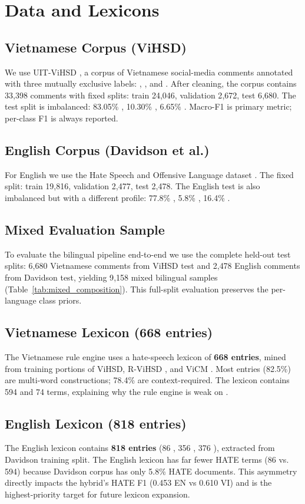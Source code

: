 \section{Data and Lexicons}
\label{sec:data}

\subsection{Vietnamese Corpus (ViHSD)}
We use UIT-ViHSD \cite{luu2021vihsd}, a corpus of Vietnamese social-media
comments annotated with three mutually exclusive labels: \clean{}, \off{}, and \hate{}.
After cleaning, the corpus contains 33{,}398 comments with fixed splits: train 24{,}046,
validation 2{,}672, test 6{,}680.  The test split is imbalanced: 83.05\% \clean{},
10.30\% \hate{}, 6.65\% \off{}.  Macro-F1 is primary metric; per-class F1 is always reported.

\subsection{English Corpus (Davidson et al.)}
For English we use the Hate Speech and Offensive Language dataset
\cite{davidson2017automated}.  The fixed split: train 19{,}816, validation 2{,}477,
test 2{,}478.  The English test is also imbalanced but with a different profile:
77.8\% \off{}, 5.8\% \hate{}, 16.4\% \clean{}.

\subsection{Mixed Evaluation Sample}
To evaluate the bilingual pipeline end-to-end we use the complete held-out test
splits: 6{,}680 Vietnamese comments from ViHSD test and 2{,}478 English comments
from Davidson test, yielding 9{,}158 mixed bilingual samples (Table~\ref{tab:mixed_composition}).
This full-split evaluation preserves the per-language class priors.



\subsection{Vietnamese Lexicon (668 entries)}
The Vietnamese rule engine uses a hate-speech lexicon of \textbf{668 entries},
mined from training portions of ViHSD, R-ViHSD \cite{bontoriTdtu}, and ViCM
\cite{nguyen2026vicm}.  Most entries (82.5\%) are multi-word constructions;
78.4\% are context-required.  The lexicon contains 594 \hate{} and 74 \off{}
terms, explaining why the rule engine is weak on \off{}.

\subsection{English Lexicon (818 entries)}
The English lexicon contains \textbf{818 entries} (86 \hate{}, 356 \off{}, 376 \clean{}),
extracted from Davidson training split.  The English lexicon has far fewer HATE
terms (86 vs. 594) because Davidson corpus has only 5.8\% HATE documents.  This
asymmetry directly impacts the hybrid's HATE F1 (0.453 EN vs 0.610 VI) and is
the highest-priority target for future lexicon expansion.
